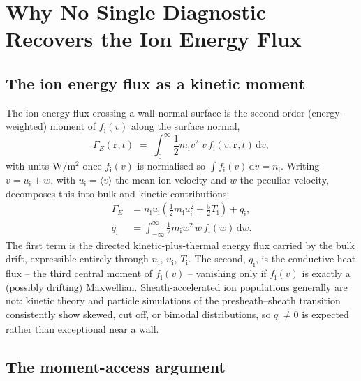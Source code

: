 \section{Why No Single Diagnostic Recovers the Ion Energy Flux}
\label{sec:why_no_single}

\subsection{The ion energy flux as a kinetic moment}

The ion energy flux crossing a wall-normal surface is the second-order (energy-weighted) moment of $f_{\mathrm{i}}(v)$ along the surface normal,
\begin{equation}
\Gamma_{E}(\mathbf{r}, t) \;=\; \int_{0}^{\infty} \frac{1}{2} m_{\mathrm{i}} v^{2} \; v \, f_{\mathrm{i}}(v; \mathbf{r}, t) \, \mathrm{d}v ,
\label{eq:gammaE_def}
\end{equation}
with units $\si{\watt\per\meter\squared}$ once $f_{\mathrm{i}}(v)$ is normalised so $\int f_{\mathrm{i}}(v)\,\mathrm{d}v = n_{\mathrm{i}}$. Writing $v = u_{\mathrm{i}} + w$, with $u_{\mathrm{i}} = \langle v \rangle$ the mean ion velocity and $w$ the peculiar velocity, decomposes this into bulk and kinetic contributions:
\begin{align}
\Gamma_{E} &= n_{\mathrm{i}} u_{\mathrm{i}} \left( \frac{1}{2} m_{\mathrm{i}} u_{\mathrm{i}}^{2} + \frac{5}{2} T_{\mathrm{i}} \right) + q_{\mathrm{i}}, \label{eq:gammaE_decomp} \\
q_{\mathrm{i}} &= \int_{-\infty}^{\infty} \frac{1}{2} m_{\mathrm{i}} w^{2} \, w \, f_{\mathrm{i}}(w) \, \mathrm{d}w. \label{eq:heatflux_def}
\end{align}
The first term is the directed kinetic-plus-thermal energy flux carried by the bulk drift, expressible entirely through $n_{\mathrm{i}}$, $u_{\mathrm{i}}$, $T_{\mathrm{i}}$. The second, $q_{\mathrm{i}}$, is the conductive heat flux -- the third central moment of $f_{\mathrm{i}}(v)$ -- vanishing only if $f_{\mathrm{i}}(v)$ is exactly a (possibly drifting) Maxwellian. Sheath-accelerated ion populations generally are not: kinetic theory and particle simulations of the presheath--sheath transition consistently show skewed, cut off, or bimodal distributions, so $q_{\mathrm{i}} \neq 0$ is expected rather than exceptional near a wall.

\subsection{The moment-access argument}

